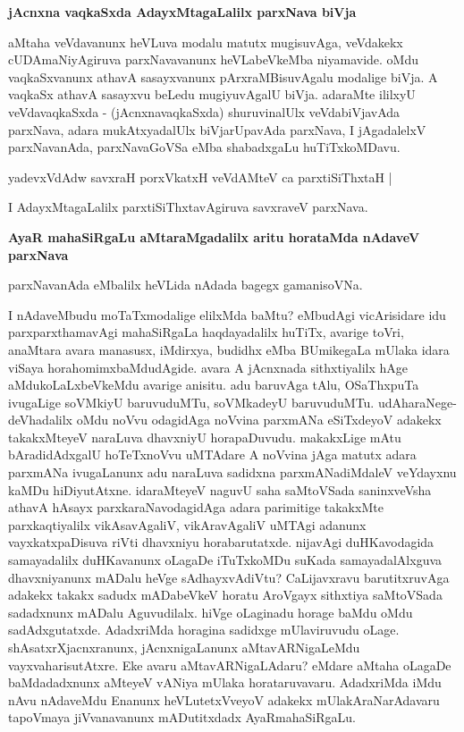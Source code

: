 {\bigskip
\noindent
{\large\bf jAcnxna vaqkaSxda AdayxMtagaLalilx parxNava biVja}}\label{page138}
\medskip

\noindent
aMtaha veVdavanunx heVLuva modalu matutx mugisuvAga, veVdakekx cUDAmaNiyAgiruva parxNavavanunx heVLabeVkeMba niyamavide. oMdu vaqkaSxvanunx athavA sasayxvanunx pArxraMBisuvAgalu modalige biVja. A vaqkaSx athavA sasayxvu beLedu mugiyuvAgalU biVja. adaraMte ililxyU veVdavaqkaSxda - (jAcnxnavaqkaSxda) shuruvinalUlx veVdabiVjavAda parxNava, adara mukAtxyadalUlx biVjarUpavAda parxNava, I jAgadalelxV parxNavanAda, parxNavaGoVSa eMba shabadxgaLu huTiTxkoMDavu.

\begin{shloka}
yadevxVdAdw savxraH porxVkatxH veVdAMteV ca parxtiSiThxtaH |\label{138}
\end{shloka}

\noindent
I AdayxMtagaLalilx parxtiSiThxtavAgiruva savxraveV parxNava.

{\bigskip
\noindent
{\large\bf AyaR mahaSiRgaLu aMtaraMgadalilx aritu horataMda nAdaveV parxNava}}\label{page138a}
\medskip

\noindent
parxNavanAda eMbalilx heVLida nAdada bagegx gamanisoVNa.

I nAdaveMbudu moTaTxmodalige elilxMda baMtu? eMbudAgi vicArisidare idu parxparxthamavAgi mahaSiRgaLa haqdayadalilx huTiTx, avarige toVri, anaMtara avara manasusx, iMdirxya, budidhx eMba BUmikegaLa mUlaka idara viSaya horahomimxbaMdudAgide. avara A jAcnxnada sithxtiyalilx hAge aMdukoLaLxbeVkeMdu avarige anisitu. adu baruvAga tAlu, OSaThxpuTa ivugaLige soVMkiyU baruvuduMTu, soVMkadeyU baruvuduMTu. udAharaNege- deVhadalilx oMdu noVvu odagidAga noVvina parxmANa eSiTxdeyoV adakekx takakxMteyeV naraLuva dhavxniyU horapaDuvudu. makakxLige mAtu bAradidAdxgalU hoTeTxnoVvu uMTAdare A noVvina jAga matutx adara parxmANa ivugaLanunx adu naraLuva sadidxna parxmANadiMdaleV veYdayxnu kaMDu hiDiyutAtxne. idaraMteyeV naguvU saha saMtoVSada saninxveVsha athavA hAsayx parxkaraNavodagidAga adara parimitige takakxMte parxkaqtiyalilx vikAsavAgaliV, vikAravAgaliV uMTAgi adanunx vayxkatxpaDisuva riVti dhavxniyu horabarutatxde. nijavAgi duHKavodagida samayadalilx duHKavanunx oLagaDe iTuTxkoMDu suKada samayadalAlxguva dhavxniyanunx mADalu heVge sAdhayxvAdiVtu? CaLijavxravu barutitxruvAga adakekx takakx sadudx mADabeVkeV horatu AroVgayx sithxtiya saMtoVSada sadadxnunx mADalu Aguvudilalx. hiVge oLaginadu horage baMdu oMdu sadAdxgutatxde. AdadxriMda horagina sadidxge mUlaviruvudu oLage. shAsatxrXjacnxranunx, jAcnxnigaLanunx aMtavARNigaLeMdu vayxvaharisutAtxre. Eke avaru aMtavARNigaLAdaru? eMdare aMtaha oLagaDe baMdadadxnunx aMteyeV vANiya mUlaka horataruvavaru. AdadxriMda iMdu nAvu nAdaveMdu Enanunx heVLutetxVveyoV adakekx mUlakAraNarAdavaru tapoVmaya jiVvanavanunx mADutitxdadx AyaRmahaSiRgaLu.

